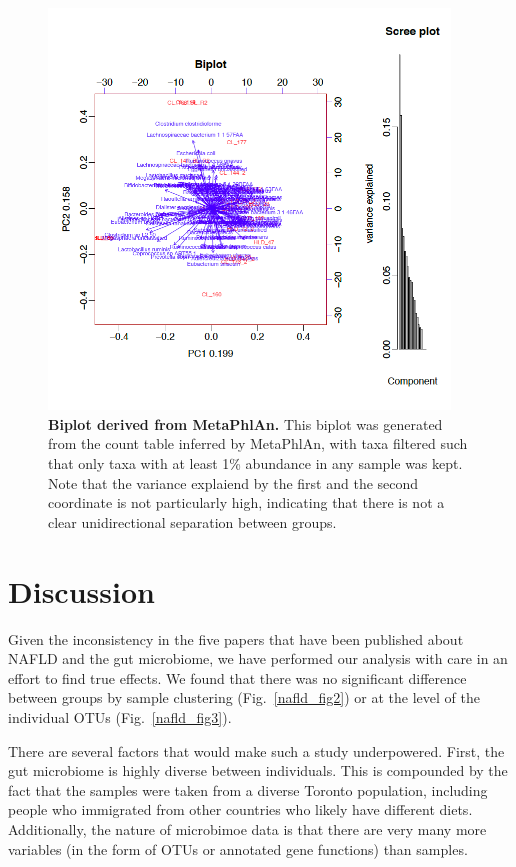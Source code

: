 \begin{figure}[h]
\begin{center}
\includegraphics[width=0.95\textwidth]{metaphlan_biplot.png}
\caption{\textbf{Biplot derived from MetaPhlAn.} This biplot was generated from the count table inferred by MetaPhlAn, with taxa filtered such that only taxa with at least 1\% abundance in any sample was kept. Note that the variance explaiend by the first and the second coordinate is not particularly high, indicating that there is not a clear unidirectional separation between groups.}
\end{center}
\label{nafld_metaphlan_barplot}
\end{figure}


\section{Discussion}

Given the inconsistency in the five papers that have been published about NAFLD and the gut microbiome, we have performed our analysis with care in an effort to find true effects. We found that there was no significant difference between groups by sample clustering (Fig.~\ref{nafld_fig2}) or at the level of the individual OTUs (Fig.~\ref{nafld_fig3}).

There are several factors that would make such a study underpowered. First, the gut microbiome is highly diverse between individuals. This is compounded by the fact that the samples were taken from a diverse Toronto population, including people who immigrated from other countries who likely have different diets. Additionally, the nature of microbimoe data is that there are very many more variables (in the form of OTUs or annotated gene functions) than samples.

